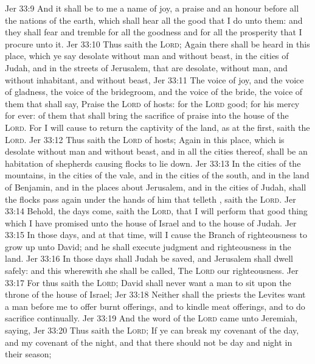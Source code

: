 \vs Jer 33:9 And it shall be to me a name of joy, a praise and an honour before all the nations of the earth, which shall hear all the good that I do unto them: and they shall fear and tremble for all the goodness and for all the prosperity that I procure unto it.
\vs Jer 33:10 Thus saith the \textsc{Lord}; Again there shall be heard in this place, which ye say  desolate without man and without beast,  in the cities of Judah, and in the streets of Jerusalem, that are desolate, without man, and without inhabitant, and without beast,
\vs Jer 33:11 The voice of joy, and the voice of gladness, the voice of the bridegroom, and the voice of the bride, the voice of them that shall say, Praise the \textsc{Lord} of hosts: for the \textsc{Lord}  good; for his mercy  for ever:  of them that shall bring the sacrifice of praise into the house of the \textsc{Lord}. For I will cause to return the captivity of the land, as at the first, saith the \textsc{Lord}.
\vs Jer 33:12 Thus saith the \textsc{Lord} of hosts; Again in this place, which is desolate without man and without beast, and in all the cities thereof, shall be an habitation of shepherds causing  flocks to lie down.
\vs Jer 33:13 In the cities of the mountains, in the cities of the vale, and in the cities of the south, and in the land of Benjamin, and in the places about Jerusalem, and in the cities of Judah, shall the flocks pass again under the hands of him that telleth , saith the \textsc{Lord}.
\vs Jer 33:14 Behold, the days come, saith the \textsc{Lord}, that I will perform that good thing which I have promised unto the house of Israel and to the house of Judah.
\vs Jer 33:15 In those days, and at that time, will I cause the Branch of righteousness to grow up unto David; and he shall execute judgment and righteousness in the land.
\vs Jer 33:16 In those days shall Judah be saved, and Jerusalem shall dwell safely: and this  wherewith she shall be called, The \textsc{Lord} our righteousness.
\vs Jer 33:17 For thus saith the \textsc{Lord}; David shall never want a man to sit upon the throne of the house of Israel;
\vs Jer 33:18 Neither shall the priests the Levites want a man before me to offer burnt offerings, and to kindle meat offerings, and to do sacrifice continually.
\vs Jer 33:19 And the word of the \textsc{Lord} came unto Jeremiah, saying,
\vs Jer 33:20 Thus saith the \textsc{Lord}; If ye can break my covenant of the day, and my covenant of the night, and that there should not be day and night in their season;
